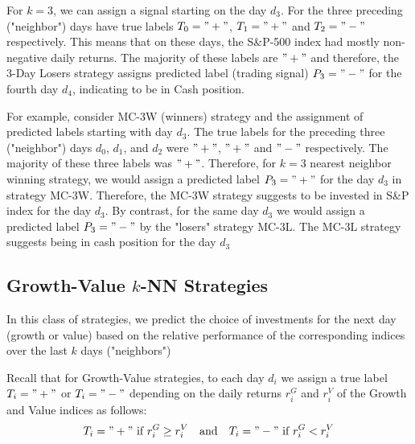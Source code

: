 \documentclass{article}
\begin{document}
For $k=3$,  we can assign a signal starting on the day $d_{3}$. For the three preceding ("neighbor") days have true labels 
$T_{0}="+"$, $T_{1}="+"$ and $T_{2}="-"$ respectively. This means that on these days, the S{\&}P-500 index had mostly non-negative daily returns. The majority of these labels are $"+"$ and therefore, the 3-Day Losers strategy assigns predicted label (trading signal) $P_{3}="-"$ for the fourth day $d_{4}$, indicating to be in Cash position.

For example, consider MC-3W (winners) strategy and the assignment of predicted labels starting with day $d_{3}$. The true labels 
for the preceding three ("neighbor") days $d_{0}$, $d_{1}$, and $d_{2}$ were $"+"$, $"+"$ and $"-"$ respectively. The majority of these three labels was $"+"$. Therefore, for $k=3$ nearest neighbor winning strategy, we would assign a predicted label $P_{3}="+"$ for 
the day $d_{3}$ in strategy MC-3W. Therefore, the MC-3W strategy suggests to be invested in S{\&}P index for the day $d_{3}$.
By contrast, for the same day $d_{3}$ we would assign a predicted label $P_{3}="-"$ by the "losers" strategy MC-3L. The MC-3L strategy suggests being in cash position for the day $d_{3}$



\subsection{Growth-Value $k$-NN Strategies}\label{subsec:growth_value_strategies}

In this class of strategies, we predict the choice of investments for the next day (growth or value) based on the relative performance of the corresponding indices over the last $k$ days ("neighbors")  

Recall that for Growth-Value strategies, to each day $d_{i}$ we assign a true label $T_{i}="+"$ or $T_{i}="-"$ depending on
the daily returns $r_{i}^{G}$ and $r_{i}^{V}$ of the Growth and Value indices as follows:
\begin{equation*}
T_{i}="+" \hbox{ if } r_{i}^{G}\geq r_{i}^{V} \quad\hbox{and}\quad
T_{i}="-" \hbox{ if } r_{i}^{G}< r_{i}^{V}
\end{equation*}
\end{document}
